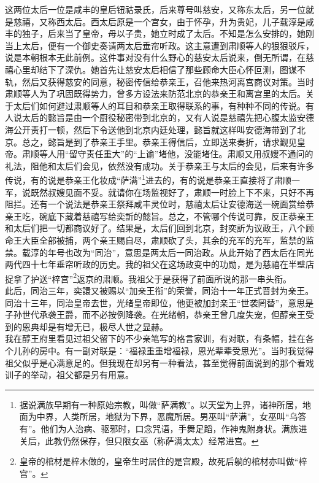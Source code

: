   这两位太后一位是咸丰的皇后钮祜录氏，后来尊号叫慈安，又称东太后，另一位就是慈禧，又称西太后。西太后原是一个宫女，由于怀孕，升为贵妃，儿子载淳是咸丰的独子，后来当了皇帝，母以子贵，她立时成了太后。不知是怎么安排的，她刚当上太后，便有一个御史奏请两太后垂帘听政。这主意遭到肃顺等人的狠狠驳斥，说是本朝根本无此前例。这件事对没有什么野心的慈安太后说来，倒无所谓，在慈禧心里却结下了深仇。她首先让慈安太后相信了那些顾命大臣心怀叵测，图谋不轨，然后又获得慈安的同意，秘密传信给恭亲王，召他来热河离宫商议对策。当时肃顺等人为了巩固既得势力，曾多方设法来防范北京的恭亲王和离宫里的太后。关于太后们如何避过肃顺等人的耳目和恭亲王取得联系的事，有种种不同的传说。有人说太后的懿旨是由一个厨役秘密带到北京的，又有人说是慈禧先把心腹太监安德海公开责打一顿，然后下令送他到北京内廷处理，懿旨就这样叫安德海带到了北京。总之，懿旨是到了恭亲王手里。恭亲王得信后，立即送来奏折，请求觐见皇帝。肃顺等人用“留守责任重大”的“上谕”堵他，没能堵住。肃顺又用叔嫂不通问的礼法，阻他和太后们会见，依然没有成功。关于恭亲王与太后的会见，后来有许多传说，有的说是恭亲王化妆成“萨满”\footnote{据说满族早期有一种原始宗教，叫做“萨满教”。以天堂为上界，诸神所居，地面为中界，人类所居，地狱为下界，恶魔所居。男巫叫“萨满”，女巫叫“乌答有”。他们为人治病、驱邪时，口念咒语，手舞足蹈，作神鬼附身状。满族进关后，此教仍然保存，但只限女巫（称萨满太太）经常进宫。}进去的，有的说是恭亲王直接将了肃顺一军，说既然叔嫂见面不妥。就请你在场监视好了，肃顺一时脸上下不来，只好不再阻拦。还有一个说法是恭亲王祭拜咸丰灵位时，慈禧太后让安德海送一碗面赏给恭亲王吃，碗底下藏着慈禧写给奕訢的懿旨。总之，不管哪个传说可靠，反正恭亲王和太后们把一切都商议好了。结果是，太后们回到北京，封奕訢为议政王，八个顾命王大臣全部被捕，两个亲王赐自尽，肃顺砍了头，其余的充军的充军，监禁的监禁。载淳的年号也改为“同治”，意思是两太后一同治政。从此开始了西太后在同光两代四十七年垂帘听政的历史。我的祖父在这场政变中的功勋，是为慈禧在半壁店捉拿了护送“梓宫”\footnote{皇帝的棺材是梓木做的，皇帝生时居住的是宫殿，故死后躺的棺材亦叫做“梓宫”。}返京的肃顺。我祖父于是获得了前面所说的那一串头衔。\\

  此后，同治三年，奕譞又被赐以“加亲王衔”的荣誉，同治十一年正式晋封为亲王。同治十三年，同治皇帝去世，光绪皇帝即位，他更被加封亲王“世袭罔替”，意思是子孙世代承袭王爵，而不必按例降袭。在光绪朝，恭亲王曾几度失宠，但醇亲王受到的恩典却是有增无已，极尽人世之显赫。\\

  我在醇王府里看见过祖父留下的不少亲笔写的格言家训，有对联，有条幅，挂在各个儿孙的房中。有一副对联是：“福禄重重增福禄，恩光辈辈受思光”。当时我觉得祖父似乎是心满意足的。但我现在却另有一种看法，甚至觉得前面说到的那个看戏训子的举动，祖父都是另有用意。\\

